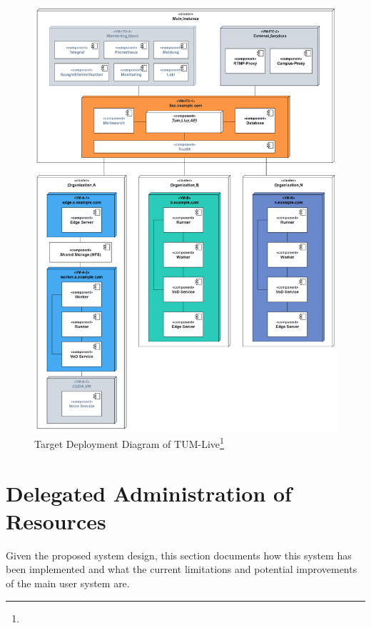 \begin{figure}[htpb]
    \centering
    \includegraphics[width=400pt]{images/DeploymentDiagramNew.png}
    \caption[Target System Architecture]{Target Deployment Diagram of TUM-Live\footnote{}}
    \label{fig:system-architecture}
\end{figure}
\break

\section{Delegated Administration of Resources}\label{section:rbac}

Given the proposed system design, this section documents how this system has been implemented and what the current limitations and potential improvements of the main user system are. 

